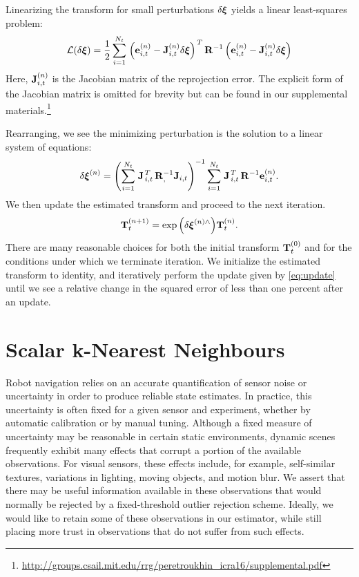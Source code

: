 Linearizing the transform for small perturbations $\delta\boldsymbol{\mathbf{\xi}}$
yields a linear least-squares problem:
\begin{equation}
  \mathcal{L}(\delta \boldsymbol{\mathbf{\xi}}) = \frac{1}{2}\sum_{i=1}^{N_t} 
  \left.{\left(\boldsymbol{\mathbf{e}}_{i,t}^{(n)}
  - \boldsymbol{\mathbf{J}}_{i,t}^{(n)} \delta\boldsymbol{\mathbf{\xi}}\right)}\right.^T
\boldsymbol{\mathbf{R}}^{-1}
 \left(\boldsymbol{\mathbf{e}}_{i,t}^{(n)}
 - \boldsymbol{\mathbf{J}}_{i,t}^{(n)} \delta\boldsymbol{\mathbf{\xi}}\right)
  \end{equation}
Here, $\boldsymbol{\mathbf{J}}_{i,t}^{(n)}$ is the Jacobian matrix of the reprojection error.
The explicit form of the Jacobian matrix is omitted for brevity but can be
found in our supplemental materials.\footnote{\url{http://groups.csail.mit.edu/rrg/peretroukhin_icra16/supplemental.pdf}}

Rearranging, we see the minimizing perturbation is the solution to a
linear system of equations:
\begin{equation}
  \delta\boldsymbol{\mathbf{\xi}}^{(n)} = 
  \left( \sum_{i=1}^{N_t} \left.{\boldsymbol{\mathbf{J}}}\right.^T_{i,t}
  \boldsymbol{\mathbf{R}}_{,}^{-1} \boldsymbol{\mathbf{J}}_{i,t} \right)^{-1}
  \sum_{i=1}^{N_t} \left.{\boldsymbol{\mathbf{J}}}\right.^T_{i,t}
  \boldsymbol{\mathbf{R}}^{-1} \boldsymbol{\mathbf{e}}_{i,t}^{(n)}. 
\label{eq:least-squares-iteration}
\end{equation}
We then update the estimated transform and proceed to the next iteration.
\begin{equation}
  \boldsymbol{\mathbf{T}}_t^{(n+1)} = \exp{\left( \delta \boldsymbol{\mathbf{\xi}} ^{(n)\wedge}
  \right)} \boldsymbol{\mathbf{T}}_t^{(n)}. \label{eq:update}
\end{equation}
There are many reasonable choices for both the initial transform
$\boldsymbol{\mathbf{T}}_t^{(0)}$ and for the conditions under which we terminate
iteration. We initialize the estimated transform to identity, and iteratively
perform the update given by \cref{eq:update} until we see a relative change in
the squared error of less than one percent after an update.  


\section{Scalar k-Nearest Neighbours}

Robot navigation relies on an accurate quantification of sensor noise or uncertainty in order to produce reliable state estimates.
In practice, this uncertainty is often fixed for a given sensor and experiment, whether by automatic calibration or by manual tuning.
Although a fixed measure of uncertainty may be reasonable in certain static environments, dynamic scenes frequently exhibit many effects that corrupt a portion of the available observations.
For visual sensors, these effects include, for example, self-similar textures, variations in lighting, moving objects, and motion blur. 
We assert that there may be useful information available in these observations that would normally be rejected by a fixed-threshold outlier rejection scheme. 
Ideally, we would like to retain some of these observations in our estimator, while still placing more trust in observations that do not suffer from such effects.

